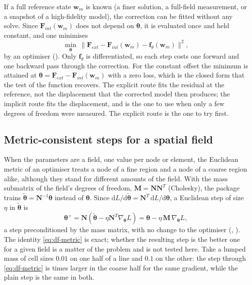 If a full reference state $\bm w_m$ is known (a finer solution, a full-field measurement, or a snapshot of a high-fidelity model), the correction can be fitted without any solve. Since $\bm F_{int}(\bm w_m)$ does not depend on $\bm\theta$, it is evaluated once and held constant, and one minimises
\begin{equation}\label{eq:df-explicit}
\min_{\bm\theta}\ \big\|\bm F_{ext}-\bm F_{int}(\bm w_m)-\bm f_\theta(\bm w_m)\big\|^2 ,
\end{equation}
by an optimiser (). Only $\bm f_\theta$ is differentiated, so each step costs one forward and one backward pass through the correction. For the constant offset the minimum is attained at $\bm\theta=\bm F_{ext}-\bm F_{int}(\bm w_m)$ with a zero loss, which is the closed form that the test of the function recovers. The explicit route fits the residual at the reference, not the displacement that the corrected model then produces; the implicit route fits the displacement, and is the one to use when only a few degrees of freedom were measured. The explicit route is the one to try first.

\subsection{Metric-consistent steps for a spatial field}\label{sec:df-metric}

When the parameters are a field, one value per node or element, the Euclidean metric of an optimiser treats a node of a fine region and a node of a coarse region alike, although they stand for different amounts of the field. With the mass submatrix of the field's degrees of freedom, $\bm M=\bm N\bm N^T$ (Cholesky), the package trains $\tilde{\bm\theta}=\bm N^{-1}\bm\theta$ instead of $\bm\theta$. Since $\mathrm dL/\mathrm d\tilde{\bm\theta}=\bm N^T\,\mathrm dL/\mathrm d\bm\theta$, a Euclidean step of size $\eta$ in $\tilde{\bm\theta}$ is
\begin{equation}\label{eq:df-metric}
\bm\theta^{+}=\bm N(\tilde{\bm\theta}-\eta\bm N^T\nabla_{\bm\theta}L)=\bm\theta-\eta\,\bm M\,\nabla_{\bm\theta}L,
\end{equation}
a step preconditioned by the mass matrix, with no change to the optimiser (, ). The identity \eqref{eq:df-metric} is exact; whether the resulting step is the better one for a given field is a matter of the problem and is not tested here. Take a lumped mass of cell sizes $0.01$ on one half of a line and $0.1$ on the other: the step through \eqref{eq:df-metric} is \adaMeshRatio{} times larger in the coarse half for the same gradient, while the plain step is the same in both.

